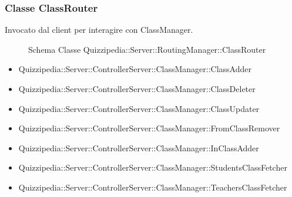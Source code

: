 \subsubsection{Classe ClassRouter}
Invocato dal client per interagire con ClassManager.
\begin{figure}[H]
\centering
\noindent{}
\caption[Schema Classe ClassRouter]{Schema Classe Quizzipedia::Server::RoutingManager::ClassRouter}
\end{figure}
\begin{itemize}
\item Quizzipedia::Server::ControllerServer::ClassManager::ClassAdder
\item Quizzipedia::Server::ControllerServer::ClassManager::ClassDeleter
\item Quizzipedia::Server::ControllerServer::ClassManager::ClassUpdater
\item Quizzipedia::Server::ControllerServer::ClassManager::FromClassRemover
\item Quizzipedia::Server::ControllerServer::ClassManager::InClassAdder
\item Quizzipedia::Server::ControllerServer::ClassManager::StudentsClassFetcher
\item Quizzipedia::Server::ControllerServer::ClassManager::TeachersClassFetcher
\end{itemize}
